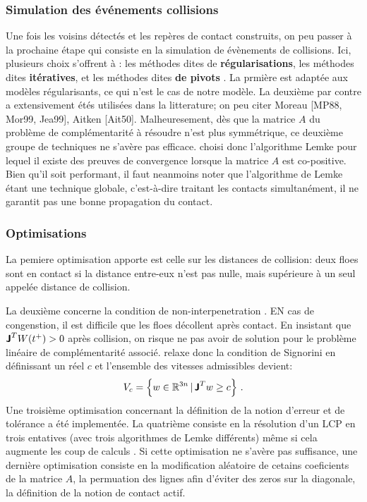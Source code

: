 \subsubsection{Simulation des événements collisions}

Une fois les voisins détectés et les repères de contact construits, on peu passer à la prochaine étape qui consiste en la simulation de évènements de collisions. Ici, plusieurs choix s'offrent à \citeauthor{rabatel2015thesis} : les méthodes dites de \textbf{régularisations}, les méthodes dites \textbf{itératives}, et les méthodes dites \textbf{de pivots} \parencite[p.82]{rabatel2015thesis}. La prmière est adaptée aux modèles régularisants, ce qui n'est le cas de notre modèle. La deuxième par contre a extensivement étés utilisées dans la litterature; on peu citer Moreau [MP88, Mor99, Jea99], Aitken [Ait50]. Malheuresement, dès que la matrice $A$ du problème de complémentarité à résoudre n'est plus symmétrique, ce deuxième groupe de techniques ne s'avère pas efficace. \citeauthor{rabatel2015thesis} choisi donc l'algorithme Lemke pour lequel il existe des preuves de convergence lorsque la matrice $A$ est co-positive. Bien qu'il soit performant, il faut neanmoins noter que l’algorithme de Lemke étant une
technique globale, c’est-à-dire traitant les contacts simultanément, il ne garantit pas une bonne propagation du contact.

\subsubsection{Optimisations}

La pemiere optimisation apporte est celle sur les distances de collision: deux floes sont en contact si la distance entre-eux n'est pas nulle, mais supérieure à un seul appelée distance de collision.

La deuxième concerne la condition de non-interpenetration \parencite[p.85]{rabatel2015thesis}. EN cas de congenstion, il est difficile que les floes décollent après contact. En insistant que $\bm{\mathsf{J}}^T W(t^+) > 0$ après collision, on risque ne pas avoir de solution pour le problème linéaire de complémentarité associé. \citeauthor{rabatel2015thesis} relaxe donc la condition de Signorini en définissant un réel $c$ et l'ensemble des vitesses admissibles devient:
$$
V_c = \left\{ w \in \mathbb{R}^{3n} \, | \, \bm{\mathsf{J}}^T w \geq c \right\} \,.
$$
Une troisième optimisation concernant la définition de la notion d'erreur et de tolérance a été implementée. La quatrième consiste en la résolution d'un LCP en trois entatives (avec trois algorithmes de Lemke différents) même si cela augmente les coup de calculs \parencite[p.86]{rabatel2015thesis}. Si cette optimisation ne s'avère pas suffisance, une dernière optimisation consiste en la modification aléatoire de cetains coeficients de la matrice $A$, la permuation des lignes afin d'éviter des zeros sur la diagonale, la définition de la notion de contact actif.


